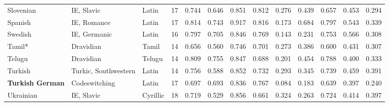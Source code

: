 \begin{tabular}{lllrrrrrrrrrr}
                      Slovenian &                      IE, Slavic &                 Latin &        17 &                       0.744 &                         0.646 &         0.851 &                  0.812 &            0.276 &                         0.439 &         0.657 &                  0.453 &            0.294 \\
                        Spanish &                     IE, Romance &                 Latin &        17 &                       0.814 &                         0.743 &         0.917 &                  0.816 &            0.173 &                         0.684 &         0.797 &                  0.543 &            0.339 \\
                        Swedish &                    IE, Germanic &                 Latin &        16 &                       0.797 &                         0.705 &         0.846 &                  0.769 &            0.143 &                         0.231 &         0.753 &                  0.566 &            0.308 \\
                         Tamil* &                       Dravidian &                 Tamil &        14 &                       0.656 &                         0.560 &         0.746 &                  0.701 &            0.273 &                         0.386 &         0.600 &                  0.431 &            0.307 \\
                         Telugu &                       Dravidian &                Telugu &        14 &                       0.809 &                         0.755 &         0.847 &                  0.688 &            0.201 &                         0.454 &         0.788 &                  0.400 &            0.333 \\
                        Turkish &            Turkic, Southwestern &                 Latin &        14 &                       0.756 &                         0.588 &         0.852 &                  0.732 &            0.293 &                         0.345 &         0.739 &                  0.459 &            0.391 \\
        \textbf{Turkish German} &                   Codeswitching &                 Latin &        17 &                       0.697 &                         0.693 &         0.836 &                  0.767 &            0.084 &                         0.183 &         0.639 &                  0.397 &            0.240 \\
                      Ukrainian &                      IE, Slavic &              Cyrillic &        18 &                       0.719 &                         0.529 &         0.856 &                  0.661 &            0.324 &                         0.263 &         0.724 &                  0.414 &            0.397 \\

\end{tabular}
